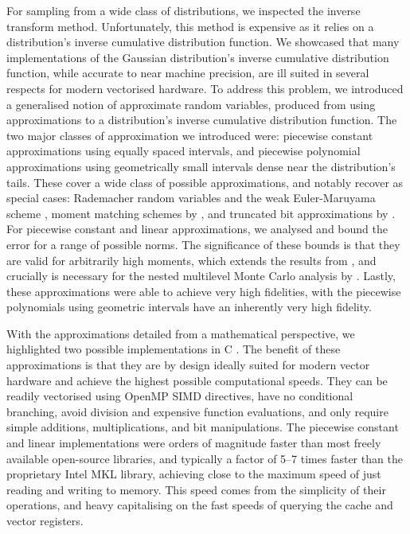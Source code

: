 \documentclass[manuscript,review]{acmart}
\begin{document}
For sampling from a wide class of distributions, we inspected the inverse transform method. Unfortunately, this method is expensive as it relies on a distribution's inverse cumulative distribution function. We showcased that many implementations of the Gaussian distribution's inverse cumulative distribution function, while accurate to near machine precision, are ill suited in several respects for modern vectorised hardware. To address this problem, we introduced a generalised notion of approximate random variables, produced from using approximations to a distribution's inverse cumulative distribution function. The two major classes of approximation we introduced were: piecewise constant approximations using equally spaced intervals, and piecewise polynomial approximations using geometrically small intervals dense near the distribution's tails. These cover a wide class of possible approximations, and notably recover as special cases: Rademacher random variables and the weak Euler-Maruyama scheme \citep{glasserman2013monte}, moment matching schemes by \citet{muller2015improving}, and truncated bit approximations by \citet{giles2019random_quadrature}. For piecewise constant and linear approximations, we analysed and bound the error for a range of possible norms. The significance of these bounds is that they are valid for arbitrarily high moments, which extends the results from \citet{giles2019random_quadrature}, and crucially is necessary for the nested multilevel Monte Carlo analysis by \citet{giles2020approximate}. Lastly, these approximations were able to achieve very high fidelities, with the piecewise polynomials using geometric intervals have an inherently very high fidelity. 

With the approximations detailed from a mathematical perspective, we highlighted two possible implementations in C \citep{sheridan2020approximate_random}. The benefit of these approximations is that they are by design ideally suited for modern vector hardware and achieve the highest possible computational speeds. They can be readily vectorised using OpenMP SIMD directives, have no conditional branching, avoid division and expensive function evaluations, and only require simple additions, multiplications, and bit manipulations. The piecewise constant and linear implementations were orders of magnitude faster than most freely available open-source libraries, and typically a factor of 5--7 times faster than the proprietary Intel MKL library, achieving close to the maximum speed of just reading and writing to memory. This speed comes from the simplicity of their operations, and heavy capitalising on the fast speeds of querying the cache and vector registers. 
\end{document}
